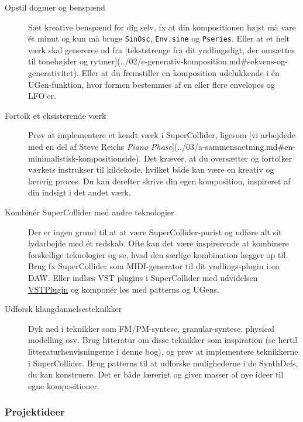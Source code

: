\begin{description}
\item[Opstil dogmer og benspænd] Sæt kreative benspænd for dig selv, fx at din kompositionen højst må vare ét minut og kun må bruge \texttt{SinOsc}, \texttt{Env.sine} og \texttt{Pseries}. Eller at et helt værk skal genereres ud fra [tekststrenge fra dit yndlingsdigt, der omsættes til tonehøjder og rytmer](../02/e-generativ-komposition.md\#sekvens-og-generativitet). Eller at du fremstiller en komposition udelukkende i én UGen-funktion, hvor formen bestemmes af en eller flere envelopes og LFO'er.

\item[Fortolk et eksisterende værk] Prøv at implementere et kendt værk i SuperCollider, ligesom [vi arbejdede med en del af Steve Reichs \textit{Piano Phase}](../03/a-sammensaetning.md\#en-minimalistisk-kompositionside). Det kræver, at du oversætter og fortolker værkets instrukser til kildekode, hvilket både kan være en kreativ og lærerig proces. Du kan derefter skrive din egen komposition, inspireret af din indsigt i det andet værk.

\item[Kombinér SuperCollider med andre teknologier] Der er ingen grund til at at være SuperCollider-purist og udføre alt sit lydarbejde med ét redskab. Ofte kan det være inspirerende at kombinere forskellige teknologier og se, hvad den særlige kombination lægger op til. Brug fx SuperCollider som MIDI-generator til dit yndlings-plugin i en DAW. Eller indlæs VST plugins i SuperCollider med udvidelsen \href{https://git.iem.at/pd/vstplugin}{VSTPlugin} og komponér løs med patterns og UGens.

\item[Udforsk klangdannelsesteknikker] Dyk ned i teknikker som FM/PM-syntese, granular-syntese, physical modelling osv. Brug litteratur om disse teknikker som inspiration (se hertil litteraturhenvisningerne i denne bog), og prøv at implementere teknikkerne i SuperCollider. Brug patterns til at udforske mulighederne i de SynthDefs, du kan konstruere. Det er både lærerigt og giver masser af nye ideer til egne kompositioner.
\end{description}
\subsubsection{Projektideer}

